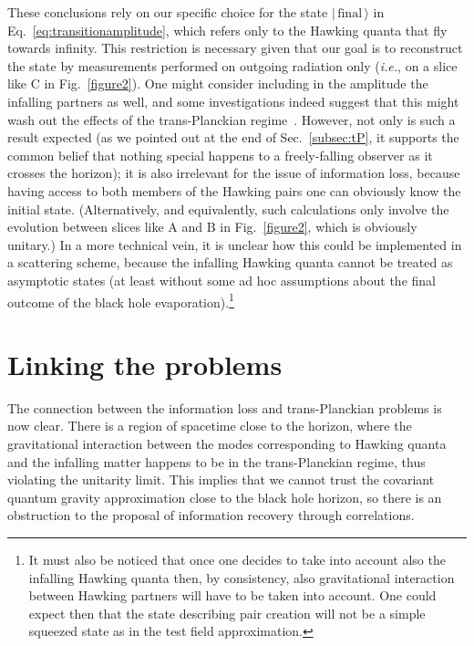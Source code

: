 \documentclass[prd,groupedaddress, showpacs, showkeys, onecolumn, nofootinbib, 12pt]{revtex4-2}
\def\ie{{\em i.e.\/}}%
\begin{document}
These conclusions rely on our specific choice for the state $|\,\mathrm{final}\,\rangle$ in Eq.~\eqref{eq:transitionamplitude}, which refers only to the Hawking quanta that fly towards infinity.  This restriction is necessary given that our goal is to reconstruct the state by measurements performed on outgoing radiation only (\ie, on a slice like C in Fig.~\ref{figure2}).  One might consider including in the amplitude the infalling partners as well, and some investigations indeed suggest that this might wash out the effects of the trans-Planckian regime~\cite{Massar:1996tx,Giddings:2006sj}.  However, not only is such a result expected (as we pointed out at the end of Sec.~\ref{subsec:tP}, it supports the common belief that nothing special happens to a freely-falling observer as it crosses the horizon); it is also irrelevant for the issue of information loss, because having access to both members of the Hawking pairs one can obviously know the initial state.  (Alternatively, and equivalently, such calculations only involve the evolution between slices like A and B in Fig.~\ref{figure2}, which is obviously unitary.)  In a more technical vein, it is unclear how this could be implemented in a scattering scheme, because the infalling Hawking quanta cannot be treated as asymptotic states (at least without some ad hoc assumptions about the final outcome of the black hole evaporation).\footnote{It must also be noticed that once one decides to take into account also the infalling Hawking quanta then, by consistency, also gravitational interaction between Hawking partners will have to be taken into account. One could expect then that the state describing pair creation will not be a simple squeezed state as in the test field approximation.}

\section{Linking the problems}
\label{sec:link}

The connection between the information loss and trans-Planckian problems is now clear.  There is a region of spacetime close to the horizon,  where the gravitational interaction between the modes corresponding to Hawking quanta and the infalling matter happens to be in the trans-Planckian regime, thus violating the unitarity limit.  This implies that we cannot trust the covariant quantum gravity approximation close to the black hole horizon, so there is an obstruction to the proposal of information recovery through correlations.
\end{document}
